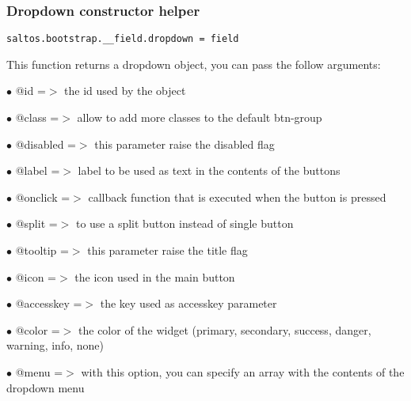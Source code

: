 \documentclass[a4paper]{article}
\begin{document}
\hypertarget{toc650}{}
\subsubsection{Dropdown constructor helper}

\begin{lstlisting}
saltos.bootstrap.__field.dropdown = field
\end{lstlisting}

This function returns a dropdown object, you can pass the follow arguments:

\begin{compactitem}
\item[\color{myblue}$\bullet$] @id        =$>$ the id used by the object
\item[\color{myblue}$\bullet$] @class     =$>$ allow to add more classes to the default btn-group
\item[\color{myblue}$\bullet$] @disabled  =$>$ this parameter raise the disabled flag
\item[\color{myblue}$\bullet$] @label     =$>$ label to be used as text in the contents of the buttons
\item[\color{myblue}$\bullet$] @onclick   =$>$ callback function that is executed when the button is pressed
\item[\color{myblue}$\bullet$] @split     =$>$ to use a split button instead of single button
\item[\color{myblue}$\bullet$] @tooltip   =$>$ this parameter raise the title flag
\item[\color{myblue}$\bullet$] @icon      =$>$ the icon used in the main button
\item[\color{myblue}$\bullet$] @accesskey =$>$ the key used as accesskey parameter
\item[\color{myblue}$\bullet$] @color     =$>$ the color of the widget (primary, secondary, success, danger, warning, info, none)
\item[\color{myblue}$\bullet$] @menu      =$>$ with this option, you can specify an array with the contents of the dropdown menu
\end{compactitem}
\end{document}
